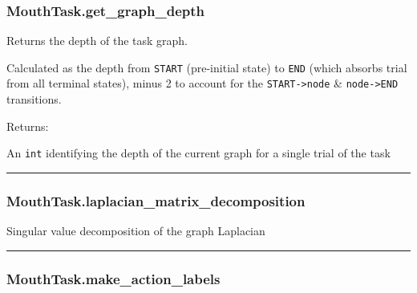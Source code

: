 \subsubsection{MouthTask.get\_graph\_depth}\label{mouthtask.get_graph_depth}

\begin{Shaded}
\begin{Highlighting}[]
\NormalTok{)}
\end{Highlighting}
\end{Shaded}

Returns the depth of the task graph.

Calculated as the depth from \texttt{START} (pre-initial state) to
\texttt{END} (which absorbs trial from all terminal states), minus 2 to
account for the \texttt{START-\textgreater{}node} \&
\texttt{node-\textgreater{}END} transitions.

Returns:

An \texttt{int} identifying the depth of the current graph for a single
trial of the task

\begin{center}\rule{0.5\linewidth}{\linethickness}\end{center}

\subsubsection{MouthTask.laplacian\_matrix\_decomposition}\label{mouthtask.laplacian_matrix_decomposition}

\begin{Shaded}
\begin{Highlighting}[]
\NormalTok{)}
\end{Highlighting}
\end{Shaded}

Singular value decomposition of the graph Laplacian

\begin{center}\rule{0.5\linewidth}{\linethickness}\end{center}

\subsubsection{MouthTask.make\_action\_labels}\label{mouthtask.make_action_labels}

\begin{Shaded}
\begin{Highlighting}[]
\NormalTok{)}
\end{Highlighting}
\end{Shaded}

